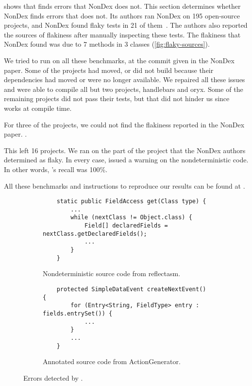  shows that \theDeterminismChecker finds errors that NonDex does not.
This section determines whether NonDex finds errors that \theDeterminismChecker does not.
Its authors ran NonDex on 195 open-source projects, and NonDex found flaky tests in
21 of them~\cite{nondex}.
The authors also reported the sources of flakiness
after manually inspecting these tests. 
The flakiness that NonDex found was due to 7 methods in 3 classes (\cref{fig:flaky-sources}).

We tried to run \theDeterminismChecker on all these benchmarks, at the
commit given in the NonDex paper.
Some of the projects had moved, or did not build because their dependencies
had moved or were no longer available.  We repaired all these issues and
were able to compile all but two
projects, handlebars and oryx.  Some of the remaining projects did not pass
their tests, but that did not hinder us since \theDeterminismChecker works
at compile time.

For three of the projects, we could not find the flakiness reported in the
NonDex paper.
.

This left 16 projects.  We ran \theDeterminismChecker on the part of the
project that the NonDex authors determined as flaky.  In every case,
\theDeterminismChecker issued a warning on the nondeterministic code.  In
other words, \theDeterminismChecker's recall was 100\%.

All these benchmarks and instructions to reproduce our results can be found at .


\begin{figure}
    \centering
    \begin{subfigure}[b]{0.95\textwidth}
        \begin{verbatim}
    static public FieldAccess get(Class type) {
        ...
        while (nextClass != Object.class) {
            Field[] declaredFields = nextClass.getDeclaredFields();
            ...
        }
    }
        \end{verbatim}
        \caption{Nondeterministic source code from reflectasm.\vspace{0.5cm}}
        \label{code-reflectasm}
    \end{subfigure}

    \begin{subfigure}[b]{0.95\textwidth}
        \begin{verbatim}
    protected SimpleDataEvent createNextEvent() {
        for (Entry<String, FieldType> entry : fields.entrySet()) {
            ...
        }
        ...
    }
        \end{verbatim}
        \caption{Annotated source code from ActionGenerator.}
        \label{code-actiongenerator}
    \end{subfigure}    
    \caption{Errors detected by \TheDeterminismChecker.}
    \label{fig:nondex-source}
\end{figure}


